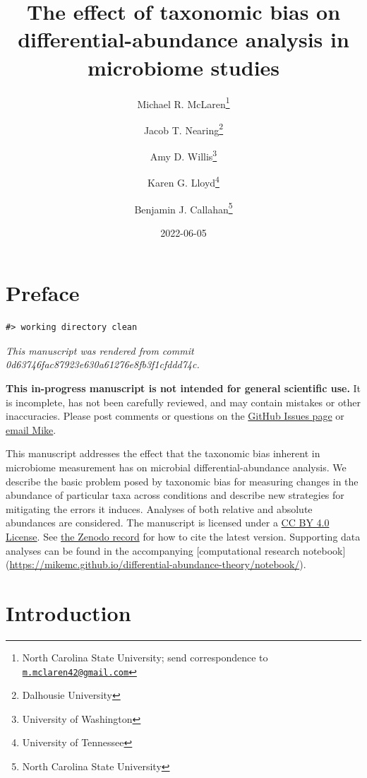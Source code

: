 \documentclass[
]{article}
\title{The effect of taxonomic bias on differential-abundance analysis in microbiome studies}
\author{Michael R. McLaren\footnote{North Carolina State University; send correspondence to \href{mailto:m.mclaren42@gmail.com}{\nolinkurl{m.mclaren42@gmail.com}}} \and Jacob T. Nearing\footnote{Dalhousie University} \and Amy D. Willis\footnote{University of Washington} \and Karen G. Lloyd\footnote{University of Tennessee} \and Benjamin J. Callahan\footnote{North Carolina State University}}
\date{2022-06-05}
\begin{document}
\maketitle

{
\setcounter{tocdepth}{2}
\tableofcontents
}
\hypertarget{preface}{%
\section*{Preface}\label{preface}}

\begin{verbatim}
#> working directory clean
\end{verbatim}

\emph{This manuscript was rendered from commit 0d63746fac87923e630a61276e8fb3f1cfddd74c.}

\leavevmode{}%
\textbf{This in-progress manuscript is not intended for general scientific use.}
It is incomplete, has not been carefully reviewed, and may contain mistakes or other inaccuracies.
Please post comments or questions on the \href{https://github.com/mikemc/differential-abundance-theory/issues}{GitHub Issues page} or \href{m.mclaren42@gmail.com}{email Mike}.

This manuscript addresses the effect that the taxonomic bias inherent in microbiome measurement has on microbial differential-abundance analysis.
We describe the basic problem posed by taxonomic bias for measuring changes in the abundance of particular taxa across conditions and describe new strategies for mitigating the errors it induces.
Analyses of both relative and absolute abundances are considered.
The manuscript is licensed under a \href{https://creativecommons.org/licenses/by/4.0/}{CC BY 4.0 License}.
See \href{https://doi.org/10.5281/zenodo.4552717}{the Zenodo record} for how to cite the latest version.
Supporting data analyses can be found in the accompanying {[}computational research notebook{]} (\url{https://mikemc.github.io/differential-abundance-theory/notebook/}).

\hypertarget{introduction}{%
\section{Introduction}\label{introduction}}
\end{document}
